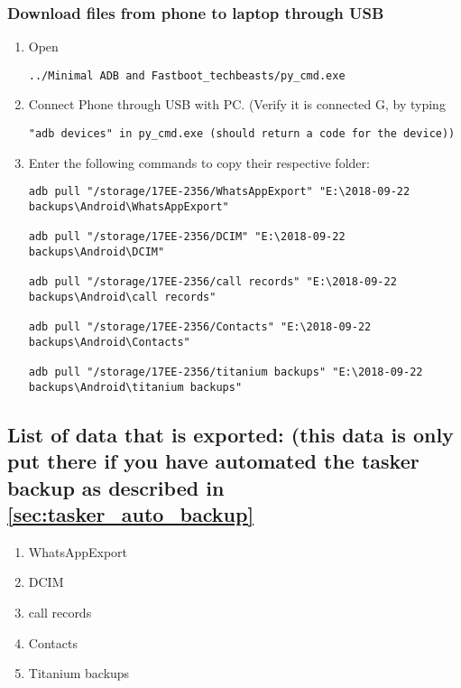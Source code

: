 \subsubsection{Download files from phone to laptop through USB}\label{subsec:mob_to_pc}
\begin{enumerate}
    \item Open 
\begin{verbatim}
../Minimal ADB and Fastboot_techbeasts/py_cmd.exe    
\end{verbatim}

    \item Connect Phone through USB with PC. (Verify it is connected G, by typing
\begin{verbatim}
"adb devices" in py_cmd.exe (should return a code for the device))    
\end{verbatim}
    \item Enter the following commands to copy their respective folder:
\begin{verbatim}
adb pull "/storage/17EE-2356/WhatsAppExport" "E:\2018-09-22 backups\Android\WhatsAppExport" 

adb pull "/storage/17EE-2356/DCIM" "E:\2018-09-22 backups\Android\DCIM"

adb pull "/storage/17EE-2356/call records" "E:\2018-09-22 backups\Android\call records" 

adb pull "/storage/17EE-2356/Contacts" "E:\2018-09-22 backups\Android\Contacts"

adb pull "/storage/17EE-2356/titanium backups" "E:\2018-09-22 backups\Android\titanium backups"    
\end{verbatim}
\end{enumerate}
\subsection{List of data that is exported: (this data is only put there if you have automated the tasker backup as described in \cref{sec:tasker_auto_backup}}
\begin{enumerate} 
    \item WhatsAppExport
    \item DCIM
    \item call records
    \item Contacts
    \item Titanium backups
\end{enumerate}
